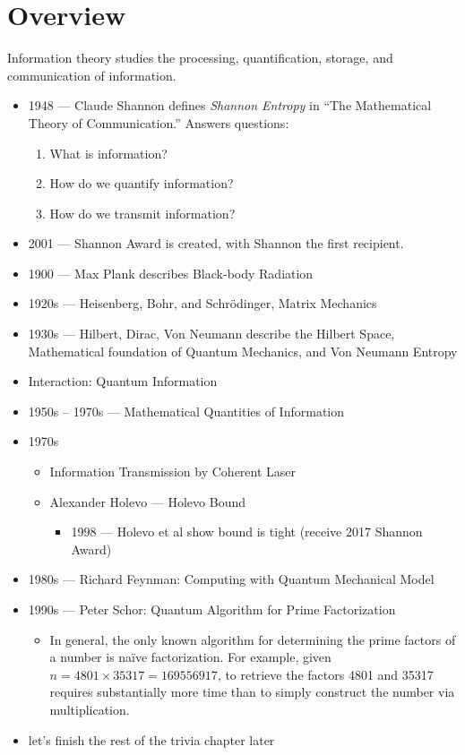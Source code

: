 \section{Overview}
Information theory studies the processing, quantification, storage, and communication
of information.
\begin{itemize}
    \item 1948 --- Claude Shannon defines \emph{Shannon Entropy} in ``The Mathematical
          Theory of Communication.'' Answers questions:
          \begin{enumerate}
              \item What is information?
              \item How do we quantify information?
              \item How do we transmit information?
          \end{enumerate}
    \item 2001 --- Shannon Award is created, with Shannon the first recipient.
    \item 1900 --- Max Plank describes Black-body Radiation
    \item 1920s --- Heisenberg, Bohr, and Schrödinger, Matrix Mechanics
    \item 1930s --- Hilbert, Dirac, Von Neumann describe the Hilbert Space, Mathematical
          foundation of Quantum Mechanics, and Von Neumann Entropy
    \item Interaction: Quantum Information
    \item 1950s -- 1970s --- Mathematical Quantities of Information
    \item 1970s
          \begin{itemize}
              \item Information Transmission by Coherent Laser
              \item Alexander Holevo --- Holevo Bound
                    \begin{itemize}
                        \item 1998 --- Holevo et al show bound is tight (receive 2017 Shannon Award)
                    \end{itemize}
          \end{itemize}
    \item 1980s --- Richard Feynman: Computing with Quantum Mechanical Model
    \item 1990s --- Peter Schor: Quantum Algorithm for Prime Factorization
          \begin{itemize}
              \item In general, the only known algorithm for determining the prime factors
                    of a number is naïve factorization. For example, given
                    $n = 4801 \times 35317 = 169556917$, to retrieve the factors
                    4801 and 35317 requires substantially more time than to simply
                    construct the number via multiplication.
          \end{itemize}
    \item let's finish the rest of the trivia chapter later
\end{itemize}